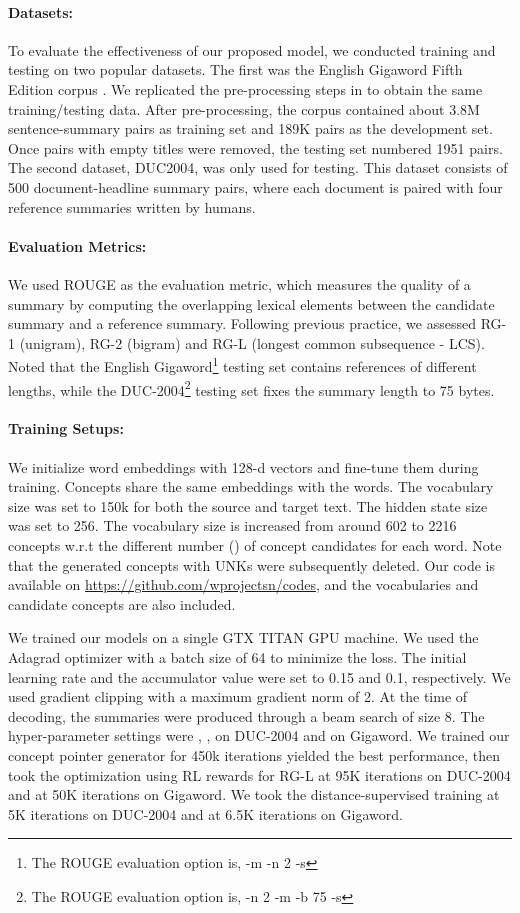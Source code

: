 \documentclass[11pt,a4paper]{article}
\begin{document}
\paragraph{Datasets:}
To evaluate the effectiveness of our proposed model, we conducted training and testing on two popular datasets. The first was the English Gigaword Fifth Edition corpus \cite{parker2011english}. We replicated the pre-processing steps in  \cite{DBLP:conf/emnlp/RushCW15} to obtain the same training/testing data. 
After pre-processing, the corpus contained about 3.8M sentence-summary pairs as training set and 189K pairs as the  development set. 
Once pairs with empty titles were removed, the testing set numbered 1951 pairs. The second dataset, DUC2004, was only used for testing. This dataset consists of 500 document-headline summary pairs, where each document is paired with four reference summaries written by humans.
\paragraph{Evaluation Metrics:}
We used ROUGE \cite{lin2004rouge} as the evaluation metric, which measures the quality of a summary by computing the overlapping lexical elements between the candidate summary and a reference summary. Following  previous practice, we assessed RG-1 (unigram), RG-2 (bigram) and RG-L (longest common subsequence - LCS). Noted that the English Gigaword\footnote{The ROUGE evaluation option is, -m -n 2 -s} testing set contains references of different lengths, while the DUC-2004\footnote{The ROUGE evaluation option is, -n 2 -m -b 75 -s} testing set fixes the summary length to 75 bytes. 


\paragraph{Training Setups:}
We initialize word embeddings with 128-d vectors  and fine-tune
them during training. Concepts share the same embeddings with the words. The vocabulary size was set to 150k for both the  source and target text. The hidden state size was set to 256. 
The vocabulary size is increased from around 602 to 2216 concepts w.r.t  the different number () of concept candidates for each word. 
Note  that the generated concepts with UNKs were subsequently  deleted. 
Our code is available on \url{https://github.com/wprojectsn/codes}, and the vocabularies and candidate concepts are also included. 


We trained our models on a single GTX TITAN GPU machine.
We used  the Adagrad optimizer with a batch size of 64 to minimize the loss. 
The initial learning rate and the accumulator value were set to 0.15 and 0.1, respectively. We used gradient clipping with a maximum gradient norm of 2. 
At the time of decoding, the summaries were produced through a beam search of size 8.
The hyper-parameter settings were , ,  on  DUC-2004 and  on Gigaword. We trained our concept pointer generator for 450k iterations yielded the best performance,  then took the optimization using RL rewards for RG-L at  95K iterations on DUC-2004 and at 50K iterations on Gigaword. We took the distance-supervised training at 5K iterations on DUC-2004 and at 6.5K iterations on Gigaword.
\end{document}
